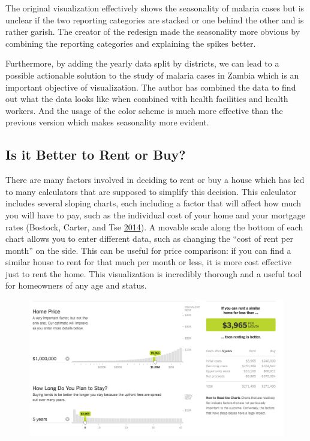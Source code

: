 \documentclass[]{book}
\begin{document}
The original visualization effectively shows the seasonality of malaria
cases but is unclear if the two reporting categories are stacked or one
behind the other and is rather garish. The creator of the redesign made
the seasonality more obvious by combining the reporting categories and
explaining the spikes better.

Furthermore, by adding the yearly data split by districts, we can lead
to a possible actionable solution to the study of malaria cases in
Zambia which is an important objective of visualization. The author has
combined the data to find out what the data looks like when combined
with health facilities and health workers. And the usage of the color
scheme is much more effective than the previous version which makes
seasonality more evident.

\subsection{Is it Better to Rent or
Buy?}\label{is-it-better-to-rent-or-buy}

There are many factors involved in deciding to rent or buy a house which
has led to many calculators that are supposed to simplify this decision.
This calculator includes several sloping charts, each including a factor
that will affect how much you will have to pay, such as the individual
cost of your home and your mortgage rates (Bostock, Carter, and Tse
\protect\hyperlink{ref-rent_or_buy}{2014}). A movable scale along the
bottom of each chart allows you to enter different data, such as
changing the ``cost of rent per month'' on the side. This can be useful
for price comparison: if you can find a similar house to rent for that
much per month or less, it is more cost effective just to rent the home.
This visualization is incredibly thorough and a useful tool for
homeowners of any age and status.

\begin{figure}
\centering
\includegraphics{images/rentcalc.png}
\caption{}
\end{figure}
\end{document}

